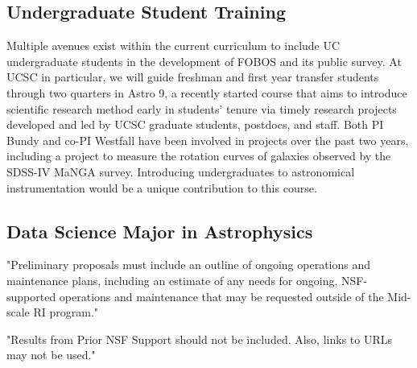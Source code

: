 \documentclass[oneside,11pt]{amsart}
\newcommand{\comment}[2][todo]{{\color{#1}[[{\bf #2}]]}}
\begin{document}
% 
% 
% 
% 
% 
% 
% 
% 
% 
% 
% 


\subsection{Undergraduate Student Training}

Multiple avenues exist within the current curriculum to include UC
undergraduate students in the development of FOBOS and its public
survey.  At UCSC in particular, we will guide freshman and first year
transfer students through two quarters in Astro 9, a recently started
course that aims to introduce scientific research method early in
students' tenure via timely research projects developed and led by UCSC
graduate students, postdocs, and staff.  Both PI Bundy and co-PI
Westfall have been involved in projects over the past two years,
including a project to measure the rotation curves of galaxies observed
by the SDSS-IV MaNGA survey.  Introducing undergraduates to astronomical
instrumentation would be a unique contribution to this course.


\subsection{Data Science Major in Astrophysics}
\noindent \comment{1/4 page}


"Preliminary proposals must include an outline of ongoing operations and
maintenance plans, including an estimate of any needs for ongoing,
NSF-supported operations and maintenance that may be requested outside
of the Mid-scale RI program."

"Results from Prior NSF Support should not be included. Also, links to
URLs may not be used."

\vspace{-0.5cm}
\end{document}
